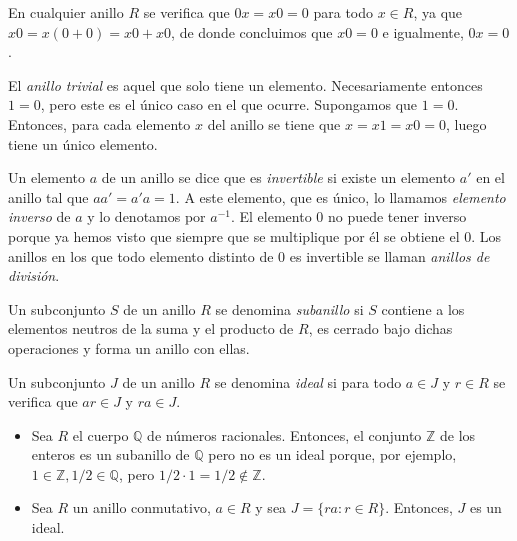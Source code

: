 En  cualquier anillo \(R\) se verifica que \(0x = x0 = 0\) para todo \(x \in R\), ya que \(x0 = x(0+0) = x0 + x0\), de donde concluimos que \(x0 = 0\) e igualmente, \(0x = 0\).

El \textit{anillo trivial} es aquel que solo tiene un elemento. 
Necesariamente entonces \(1 = 0\), pero este es el único caso en el que ocurre. 
Supongamos que \(1 = 0\). 
Entonces, para cada elemento \(x\) del anillo se tiene que \(x = x1 = x0 = 0\), luego tiene un único elemento.


Un elemento \(a\) de un anillo se dice que es \textit{invertible} si existe un elemento \(a'\) en el anillo tal que \(aa' = a'a = 1\).
A este elemento, que es único, lo llamamos \textit{elemento inverso} de \(a\) y lo denotamos por \(a^{-1}\).
El elemento \(0\) no puede tener inverso porque ya hemos visto que siempre que se multiplique por él se obtiene el \(0\).
Los anillos en los que todo elemento distinto de 0 es invertible se llaman \textit{anillos de división}.



\begin{definition}[Subanillo]
  Un subconjunto \(S\) de un anillo \(R\) se denomina \textit{subanillo} si \(S\) contiene a los elementos neutros de la suma y el producto de \(R\), es cerrado bajo dichas operaciones y forma un anillo con ellas.
\end{definition}

\begin{definition}[Ideal]
  Un subconjunto \(J\) de un anillo \(R\) se denomina \textit{ideal} si para todo \(a \in J\) y \(r \in R\) se verifica que \(ar \in J\) y \(ra \in J\).
\end{definition}


\begin{example}\hfill
  \begin{itemize}
    \item Sea \(R\) el cuerpo \(\mathbb Q\) de números racionales. Entonces, el conjunto \(\mathbb Z\) de los enteros es un subanillo de \(\mathbb Q\) pero no es un ideal porque, por ejemplo, \(1 \in \mathbb Z, 1/2 \in \mathbb Q\), pero \(1/2 \cdot 1 = 1/2 \notin \mathbb Z\). 
    \item Sea \(R\) un anillo conmutativo, \(a \in R\) y sea \(J = \{ra : r \in R\}\). Entonces, \(J\) es un ideal.
  \end{itemize}
\end{example}

